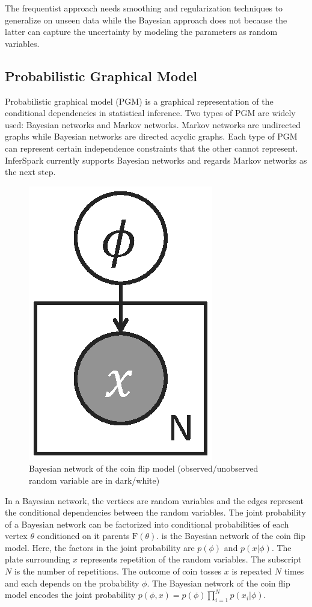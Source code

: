 The frequentist approach needs smoothing and regularization techniques to
generalize on unseen data while the Bayesian approach does not because the
latter can capture the uncertainty by modeling the parameters as random
variables. 

\subsection{Probabilistic Graphical Model}

Probabilistic graphical model  (PGM) is a graphical representation of the
conditional dependencies in statistical inference. Two types of PGM are widely
used: Bayesian networks and Markov networks. Markov networks are undirected
graphs while Bayesian networks are directed acyclic graphs. Each type of PGM
can represent certain independence constraints that the other cannot represent. 
InferSpark currently supports Bayesian networks and regards Markov networks 
as the next step.  
\begin{figure}[h]
	\centering
	\includegraphics[scale=0.5,clip]{figs/one_coin.eps}
	\caption{Bayesian network of the coin flip model (observed/unobserved random
	variable are in dark/white)}
	\label{fig:coin_bn}
\end{figure}

In a Bayesian network, the vertices are random variables and the edges
represent the conditional dependencies between the random variables.
The joint probability of a Bayesian network can be factorized into conditional
probabilities of each vertex $\theta$ conditioned on it parents
$\mathrm{F}(\theta)$. 
 is the Bayesian network of the coin flip model.  
Here, the factors in the joint
probability are $p(\phi)$ and $p(x|\phi)$. The plate surrounding $x$ represents
repetition of the random variables. The subscript $N$ is the number of
repetitions. The outcome of coin tosses $x$ is repeated $N$ times and
each depends on the probability $\phi$. The Bayesian network of the coin flip
model encodes the joint probability $p(\phi, x) =
p(\phi)\prod_{i=1}^{N}p(x_i|\phi)$. 

